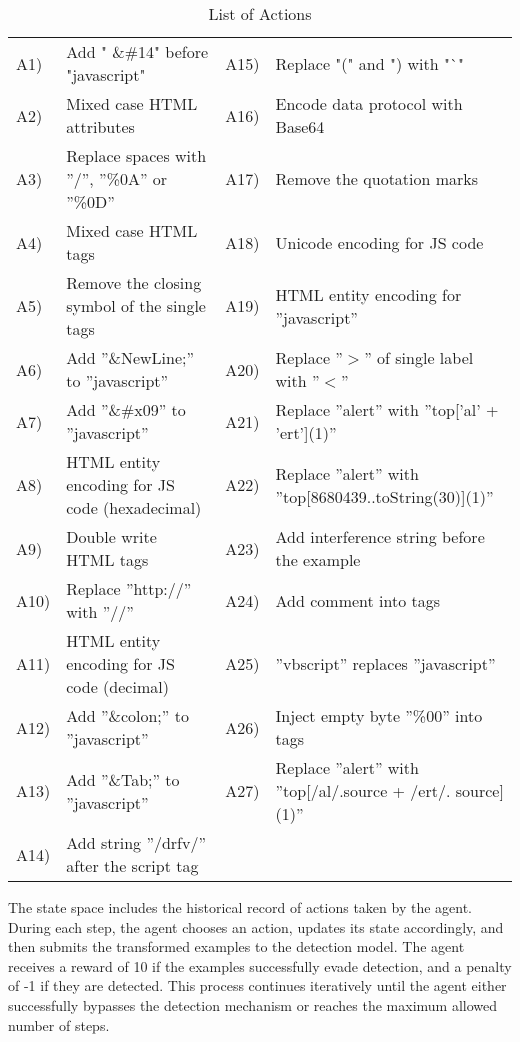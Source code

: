 \begin{table}[!h]
\caption{List of Actions} \label{tab:actions_reference}
\centering
\scalebox {0.7} {
\begin{tabular}{llll}
    \toprule
    
    A1) & Add " \&\#14" before "javascript" & A15) & Replace "(" and ") with "`" \\
    A2) & Mixed case HTML attributes & A16) & Encode data protocol with Base64 \\
    A3) & Replace spaces with ”/”, ”\%0A” or ”\%0D” & A17) & Remove the quotation marks \\
    A4) & Mixed case HTML tags & A18) & Unicode encoding for JS code \\
    A5) & Remove the closing symbol of the single tags & A19) & HTML entity encoding for ”javascript” \\
    A6) & Add ”\&NewLine;” to ”javascript” & A20) & Replace ”$>$” of single label with ”$<$” \\
    A7) & Add ”\&\#x09” to ”javascript” & A21) & Replace ”alert” with ”top[’al’ + ’ert’](1)” \\
    A8) & HTML entity encoding for JS code (hexadecimal) & A22) & Replace ”alert” with ”top[8680439..toString(30)](1)” \\
    A9) & Double write HTML tags & A23) & Add interference string before the example \\
    A10) & Replace ”http://” with ”//” & A24) & Add comment into tags \\
    A11) & HTML entity encoding for JS code (decimal) & A25) & ”vbscript” replaces ”javascript” \\
    A12) & Add ”\&colon;” to ”javascript” & A26) & Inject empty byte ”\%00” into tags \\
    A13) & Add ”\&Tab;” to ”javascript” & A27) & Replace ”alert” with ”top[/al/.source + /ert/. source](1)” \\
    A14) & Add string ”/drfv/” after the script tag & \\
    \bottomrule
\end{tabular}

}

\label{tab:actions}
\end{table}

The state space includes the historical record of actions taken by the agent. During each step, the agent chooses an action, updates its state accordingly, and then submits the transformed examples to the detection model. The agent receives a reward of 10 if the examples successfully evade detection, and a penalty of -1 if they are detected. This process continues iteratively until the agent either successfully bypasses the detection mechanism or reaches the maximum allowed number of steps.


